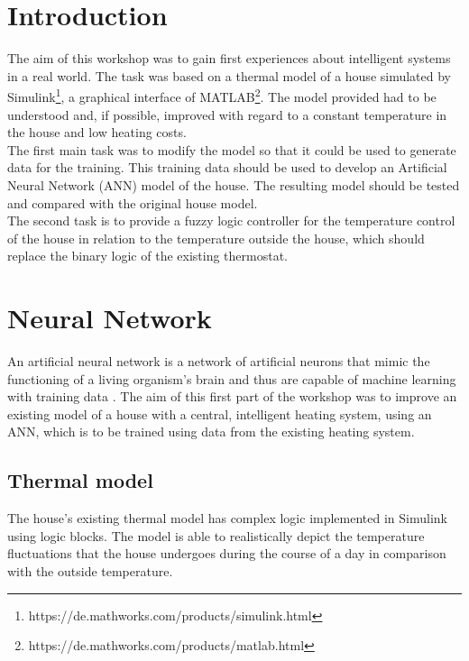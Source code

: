 \lstset{language=Java, numbers=left, numberstyle=\tiny, stepnumber=2, numbersep=5pt}
\chapter{Introduction}
\label{intro}
The aim of this workshop was to gain first experiences about intelligent systems in a real world. The task was based on a thermal model of a house simulated by Simulink\footnote{https://de.mathworks.com/products/simulink.html}, a graphical interface of MATLAB\footnote{https://de.mathworks.com/products/matlab.html}.
The model provided had to be understood and, if possible, improved with regard to a constant temperature in the house and low heating costs.
\\
The first main task was to modify the model so that it could be used to generate data for the training.
This training data should be used to develop an Artificial Neural Network (ANN) model of
the house. The resulting model should be tested and compared with the original house model.
\\
The second task is to provide a fuzzy logic controller for the temperature control of the
house in relation to the temperature outside the house, which should replace the binary logic of the existing thermostat.

\chapter{Neural Network}
\label{neuralnetwork}
An artificial neural network is a network of artificial neurons that mimic the functioning of a living organism's brain and thus are capable of machine learning with training data \cite[][]{DK01}. The aim of this first part of the workshop was to improve an existing model of a house with a central, intelligent heating system, using an ANN, which is to be trained using data from the existing heating system.
\section{Thermal model}
The house's existing thermal model has complex logic implemented in Simulink using logic blocks. The model is able to realistically depict the temperature fluctuations that the house undergoes during the course of a day in comparison with the outside temperature. 
